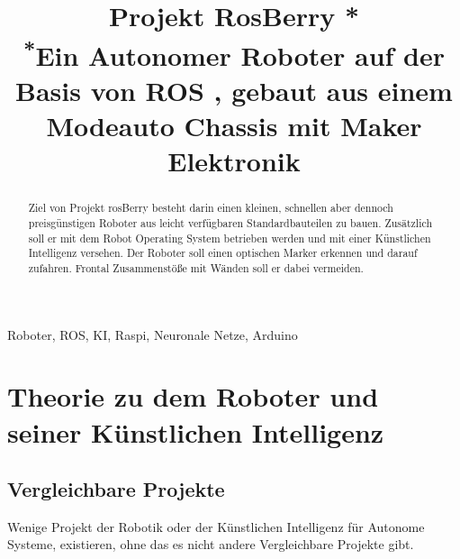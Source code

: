 \documentclass[conference]{IEEEtran}
\begin{document}
\title{Projekt RosBerry *\\
{\footnotesize \textsuperscript{*}Ein Autonomer Roboter auf der Basis von ROS , gebaut aus einem Modeauto Chassis mit Maker Elektronik}}

\author{
%
\and
{}
\and
{}
}

\maketitle

\begin{abstract}
Ziel von Projekt rosBerry besteht darin einen kleinen, schnellen aber dennoch preisgünstigen Roboter aus leicht verfügbaren Standardbauteilen zu bauen. Zusätzlich soll er mit dem Robot Operating System betrieben werden und mit einer Künstlichen Intelligenz versehen. Der Roboter soll einen optischen Marker erkennen und darauf zufahren. Frontal Zusammenstöße mit Wänden soll er dabei vermeiden.
\end{abstract}

\begin{IEEEkeywords}
Roboter, ROS, KI, Raspi, Neuronale Netze, Arduino
\end{IEEEkeywords}

\section{Theorie zu dem Roboter und seiner Künstlichen Intelligenz}

\subsection{Vergleichbare Projekte}	%
Wenige Projekt der Robotik oder der Künstlichen Intelligenz für Autonome Systeme, existieren, ohne das es nicht andere Vergleichbare Projekte gibt. \\
\end{document}
